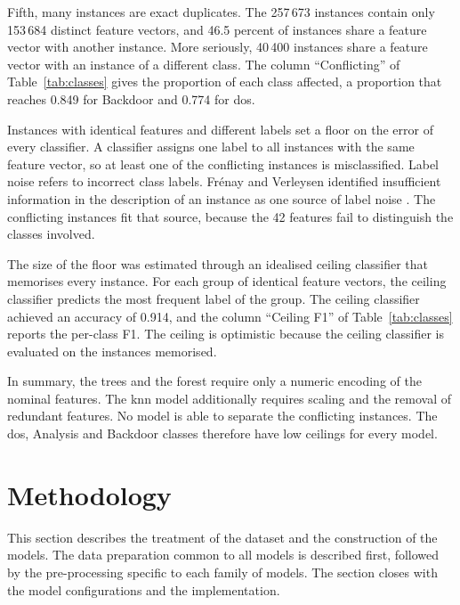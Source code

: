 \documentclass[conference]{IEEEtran}
\begin{document}
Fifth, many instances are exact duplicates. The 257\,673 instances contain only
153\,684 distinct feature vectors, and 46.5 percent of instances share a feature
vector with another instance. More seriously, 40\,400 instances share a feature
vector with an instance of a different class. The column ``Conflicting'' of
Table~\ref{tab:classes} gives the proportion of each class affected, a proportion
that reaches 0.849 for Backdoor and 0.774 for \gls{dos}.

Instances with identical features and different labels set a floor on the error
of every classifier. A classifier assigns one label to all instances with the same
feature vector, so at least one of the conflicting instances is misclassified.
Label noise refers to incorrect class labels. Fr\'enay and Verleysen
identified insufficient information in the description of an instance as one source
of label noise \cite{frenay2014}. The conflicting instances fit that source,
because the 42 features fail to distinguish the classes involved.

The size of the floor was estimated through an idealised ceiling classifier that
memorises every instance. For each group of identical feature vectors, the ceiling
classifier predicts the most frequent label of the group. The ceiling classifier
achieved an accuracy of 0.914, and the column ``Ceiling F1'' of
Table~\ref{tab:classes} reports the per-class F1. The ceiling is optimistic
because the ceiling classifier is evaluated on the instances memorised.

In summary, the trees and the forest require only a numeric encoding of the nominal
features. The \gls{knn} model additionally requires scaling and the removal of
redundant features. No model is able to separate the conflicting instances. The
\gls{dos}, Analysis and Backdoor classes therefore have low ceilings for every
model.

\section{Methodology}

This section describes the treatment of the dataset and the construction of the
models. The data preparation common to all models is described first, followed by
the pre-processing specific to each family of models. The section closes with the
model configurations and the implementation.
\end{document}
